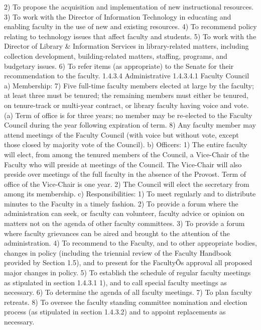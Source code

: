 \documentclass[letterpaper, 11pt]{article}
\begin{document}
			2) To propose the acquisition and implementation of new instructional resources.
			3) To work with the Director of Information Technology in educating and enabling faculty in the use of new and existing resources.
			4) To recommend policy relating to technology issues that affect faculty and students.
			5) To work with the Director of Library \& Information Services in library-related matters, including collection development, building-related matters, staffing, programs, and budgetary issues.
			6) To refer items (as appropriate) to the Senate for their recommendation to the faculty.
			1.4.3.4 Administrative
			1.4.3.4.1 Faculty Council
			a) Membership:
			7) Five full-time faculty members elected at large by the faculty; at least three must be tenured; the remaining members must either be tenured, on tenure-track or multi-year contract, or library faculty having voice and vote.
			(a) Term of office is for three years; no member may be re-elected to the Faculty Council during the year following expiration of term.
			8) Any faculty member may attend meetings of the Faculty Council (with voice but without vote, except those closed by majority vote of the Council).
			b) Officers:
			1) The entire faculty will elect, from among the tenured members of the Council, a Vice-Chair of the Faculty who will preside at meetings of the Council.  The Vice-Chair will also preside over meetings of the full faculty in the absence of the Provost.  Term of office of the Vice-Chair is one year.
			2) The Council will elect the secretary from among its membership.
			c) Responsibilities:
			1) To meet regularly and to distribute minutes to the Faculty in a timely fashion.
			2) To provide a forum where the administration can seek, or faculty can volunteer, faculty advice or opinion on matters not on the agenda of other faculty committees.
			3) To provide a forum where faculty grievances can be aired and brought to the attention of the administration.
			4) To recommend to the Faculty, and to other appropriate bodies, changes in policy (including the triennial review of the Faculty Handbook provided by Section 1.5), and to present for the FacultyÕs approval all proposed major changes in policy.
			5) To establish the schedule of regular faculty meetings as stipulated in section 1.4.3.1 1), and to call special faculty meetings as necessary.
			6) To determine the agenda of all faculty meetings.
			7) To plan faculty retreats.
			8) To oversee the faculty standing committee nomination and election process (as stipulated in section 1.4.3.2)  and to appoint replacements as necessary.
\end{document}
